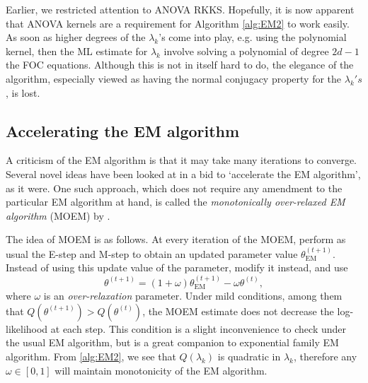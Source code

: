 \begin{remark}
  Earlier, we restricted attention to ANOVA RKKS. 
  Hopefully, it is now apparent that ANOVA kernels are a requirement for Algorithm \ref{alg:EM2} to work easily.
  As soon as higher degrees of the $\lambda_k$'s come into play, e.g. using the polynomial kernel, then the ML estimate for $\lambda_k$ involve solving a polynomial of degree $2d-1$ the FOC equations.
  Although this is not in itself hard to do, the elegance of the algorithm, especially viewed as having the normal conjugacy property for the $\lambda_k's$, is lost.
\end{remark}

\subsection{Accelerating the EM algorithm}

A criticism of the EM algorithm is that it may take many iterations to converge.
Several novel ideas have been looked at in a bid to `accelerate the EM algorithm', as it were.
One such approach, which does not require any amendment to the particular EM algorithm at hand, is called the \emph{monotonically over-relaxed EM algorithm} (MOEM) by \citet{yu2012monotonically}.

The idea of MOEM is as follows.
At every iteration of the MOEM, perform as usual the E-step and M-step to obtain an updated parameter value $\theta^{(t+1)}_\text{EM}$.
Instead of using this update value of the parameter, modify it instead, and use
\[
  \theta^{(t+1)} = (1 + \omega) \theta^{(t+1)}_\text{EM} - \omega \theta^{(t)},
\]
where $\omega$ is an \emph{over-relaxation} parameter.
Under mild conditions, among them that $Q(\theta^{(t+1)}) > Q(\theta^{(t)})$, the MOEM estimate does not decrease the log-likelihood at each step.
This condition is a slight inconvenience to check under the usual EM algorithm, but is a great companion to exponential family EM algorithm.
From \eqref{alg:EM2}, we see that $Q(\lambda_k)$ is quadratic in $\lambda_k$, therefore any $\omega \in [0,1]$ will maintain monotonicity of the EM algorithm.

\gitAbbrevHash



























